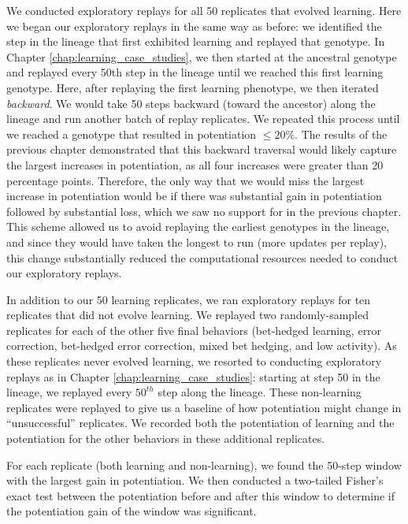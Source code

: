 We conducted exploratory replays for all 50 replicates that evolved learning.
Here we began our exploratory replays in the same way as before: we identified the step in the lineage that first exhibited learning and replayed that genotype.
In Chapter \ref{chap:learning_case_studies}, we then started at the ancestral genotype and replayed every 50th step in the lineage until we reached this first learning genotype. 
Here, after replaying the first learning phenotype, we then iterated \textit{backward}.
We would take 50 steps backward (toward the ancestor) along the lineage and run another batch of replay replicates. 
We repeated this process until we reached a genotype that resulted in potentiation $\leq 20\%$.  
The results of the previous chapter demonstrated that this backward traversal would likely capture the largest increases in potentiation, as all four increases were greater than 20 percentage points. 
Therefore, the only way that we would miss the largest increase in potentiation would be if there was substantial gain in potentiation followed by substantial loss, which we saw no support for in the previous chapter. 
This scheme allowed us to avoid replaying the earliest genotypes in the lineage, and since they would have taken the longest to run (more updates per replay), this change substantially reduced the computational resources needed to conduct our exploratory replays. 

In addition to our 50 learning replicates, we ran exploratory replays for ten replicates that did not evolve learning. 
We replayed two randomly-sampled replicates for each of the other five final behaviors (bet-hedged learning, error correction, bet-hedged error correction, mixed bet hedging, and low activity). 
As these replicates never evolved learning, we resorted to conducting exploratory replays as in Chapter \ref{chap:learning_case_studies}: starting at step 50 in the lineage, we replayed every $50^{th}$ step along the lineage. 
These non-learning replicates were replayed to give us a baseline of how potentiation might change in ``unsuccessful'' replicates. 
We recorded both the potentiation of learning and the potentiation for the other behaviors in these additional replicates. 

For each replicate (both learning and non-learning), we found the 50-step window with the largest gain in potentiation. 
We then conducted a two-tailed Fisher's exact test between the potentiation before and after this window to determine if the potentiation gain of the window was significant. 

